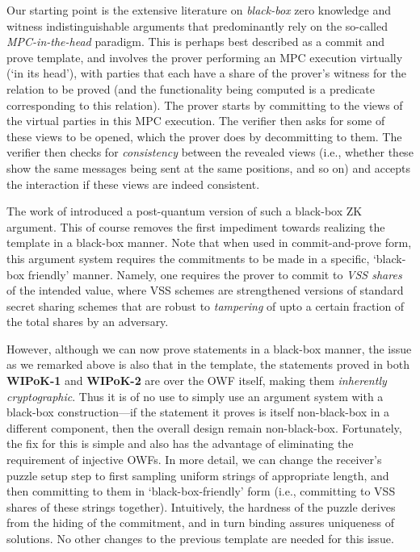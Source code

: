 Our starting point is the extensive literature on {\em black-box} zero knowledge and witness indistinguishable arguments  that predominantly rely on the so-called {\em MPC-in-the-head} paradigm. This is perhaps best described as a commit and prove template, and involves the prover performing an MPC execution virtually (`in its head'), with parties that each have a share of the prover's witness for the relation to be proved (and the functionality being computed is a predicate corresponding to this relation). The prover starts by committing to the views of the virtual parties in this MPC execution. The verifier then asks for some of these views to be opened, which the prover does by decommitting to them. The verifier then checks for {\em consistency} between the revealed views (i.e., whether these show the same messages being sent at the same positions, and so on) and accepts the interaction if these views are indeed consistent.  


The work of \cite{C:CCLY22} introduced a post-quantum version of such a black-box ZK argument. This of course removes the first impediment towards realizing the \cite{FOCS:LPY23} template in a black-box manner. Note that when used in commit-and-prove form, this argument system requires the commitments to be made in a specific, `black-box friendly' manner. Namely, one requires the prover to commit to {\em VSS shares} of the intended value, where VSS schemes are strengthened versions of standard secret sharing schemes that are robust to {\em tampering} of upto a certain fraction of the total shares by an adversary. 

However, although we can now prove statements in a black-box manner, the issue as we remarked above is also that in the \cite{FOCS:LPY23} template, the statements proved in both {\bf WIPoK-1} and {\bf WIPoK-2} are over the OWF itself, making them {\em inherently cryptographic}. Thus it is of no use to simply use an argument system with a black-box construction---if the statement it proves is itself non-black-box in a different component, then the overall design remain non-black-box. Fortunately, the fix for this is simple and also has the advantage of eliminating the requirement of injective OWFs. In more detail, we can change the receiver's puzzle setup step to first sampling uniform strings of appropriate length, and then committing to them in `black-box-friendly' form (i.e., committing to VSS shares of these strings together). Intuitively, the hardness of the puzzle derives from the hiding of the commitment, and in turn binding assures uniqueness of solutions. No other changes to the previous template are needed for this issue.  
\fi 


